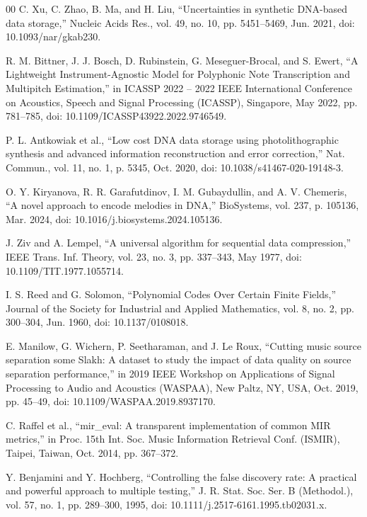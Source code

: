 \documentclass[conference]{IEEEtran}
\begin{document}
\begin{thebibliography}{00}
 C. Xu, C. Zhao, B. Ma, and H. Liu, ``Uncertainties in synthetic DNA-based data storage,'' Nucleic Acids Res., vol. 49, no. 10, pp. 5451--5469, Jun. 2021, doi: 10.1093/nar/gkab230.

 R. M. Bittner, J. J. Bosch, D. Rubinstein, G. Meseguer-Brocal, and S. Ewert, ``A Lightweight Instrument-Agnostic Model for Polyphonic Note Transcription and Multipitch Estimation,'' in ICASSP 2022 -- 2022 IEEE International Conference on Acoustics, Speech and Signal Processing (ICASSP), Singapore, May 2022, pp. 781--785, doi: 10.1109/ICASSP43922.2022.9746549.

 P. L. Antkowiak et al., ``Low cost DNA data storage using photolithographic synthesis and advanced information reconstruction and error correction,'' Nat. Commun., vol. 11, no. 1, p. 5345, Oct. 2020, doi: 10.1038/s41467-020-19148-3.

 O. Y. Kiryanova, R. R. Garafutdinov, I. M. Gubaydullin, and A. V. Chemeris, ``A novel approach to encode melodies in DNA,'' BioSystems, vol. 237, p. 105136, Mar. 2024, doi: 10.1016/j.biosystems.2024.105136.

 J. Ziv and A. Lempel, ``A universal algorithm for sequential data compression,'' IEEE Trans. Inf. Theory, vol. 23, no. 3, pp. 337--343, May 1977, doi: 10.1109/TIT.1977.1055714.

 I. S. Reed and G. Solomon, ``Polynomial Codes Over Certain Finite Fields,'' Journal of the Society for Industrial and Applied Mathematics, vol. 8, no. 2, pp. 300--304, Jun. 1960, doi: 10.1137/0108018.

 E. Manilow, G. Wichern, P. Seetharaman, and J. Le Roux, ``Cutting music source separation some Slakh: A dataset to study the impact of data quality on source separation performance,'' in 2019 IEEE Workshop on Applications of Signal Processing to Audio and Acoustics (WASPAA), New Paltz, NY, USA, Oct. 2019, pp. 45--49, doi: 10.1109/WASPAA.2019.8937170.

 C. Raffel et al., ``mir\_eval: A transparent implementation of common MIR metrics,'' in Proc. 15th Int. Soc. Music Information Retrieval Conf. (ISMIR), Taipei, Taiwan, Oct. 2014, pp. 367--372.

 Y. Benjamini and Y. Hochberg, ``Controlling the false discovery rate: A practical and powerful approach to multiple testing,'' J. R. Stat. Soc. Ser. B (Methodol.), vol. 57, no. 1, pp. 289--300, 1995, doi: 10.1111/j.2517-6161.1995.tb02031.x.

\end{thebibliography}
\end{document}
